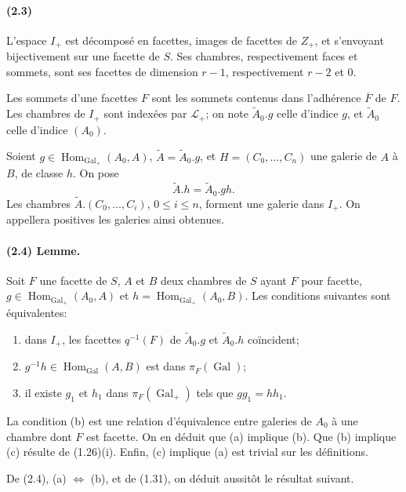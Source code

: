 \documentclass[10pt,a4paper]{article}
\newcommand{\mcL}{\mathcal L}
\begin{document}
\paragraph{(2.3)} L'espace \(I_+\) est décomposé en facettes, images de facettes de \(Z_+\), et s'envoyant bijectivement sur une facette de \(S\). Ses chambres, respectivement faces et sommets, sont ses facettes de dimension \(r-1\), respectivement \(r-2\) et \(0\).

Les sommets d'une facettes \(F\) sont les sommets contenus dans l'adhérence \(\overline F\) de \(F\). Les chambres de \(I_+\) sont indexées par \(\mcL_+\); on note \(\widetilde A_0.g\) celle d'indice \(g\), et \(\widetilde A_0\) celle d'indice \((A_0)\).

Soient \(g\in\operatorname{Hom}_{\operatorname{Gal}_+}(A_0,A)\), \(\widetilde A=\widetilde A_0.g\), et \(H=(C_0,\ldots,C_n)\) une galerie de \(A\) à \(B\), de classe \(h\). On pose
\[
\widetilde A.h=\widetilde A_0.gh.
\]
Les chambres \(\widetilde A.(C_0,\ldots,C_i)\), \(0\le i\le n\), forment une galerie dans \(I_+\). On appellera positives les galeries ainsi obtenues.

\paragraph{(2.4) Lemme.} Soit \(F\) une facette de \(S\), \(A\) et \(B\) deux chambres de \(S\) ayant \(F\) pour facette, \(g\in\operatorname{Hom}_{\operatorname{Gal}_+}(A_0,A)\) et \(h=\operatorname{Hom}_{\operatorname{Gal}_+}(A_0,B)\). Les conditions suivantes sont équivalentes:
\begin{enumerate}[label=(\alph*)]
\item dans \(I_+\), les facettes \(q^{-1}(F)\) de \(\widetilde A_0.g\) et \(\widetilde A_0.h\) coïncident;
\item \(g^{-1}h\in\operatorname{Hom}_{\operatorname{Gal}}(A,B)\) est dans \(\pi_F(\operatorname{Gal})\);
\item il existe \(g_1\) et \(h_1\) dans \(\pi_F(\operatorname{Gal}_+)\) tels que \(gg_1=hh_1\).
\end{enumerate}
La condition (b) est une relation d'équivalence entre galeries de \(A_0\) à une chambre dont \(F\) est facette. On en déduit que (a) implique (b). Que (b) implique (c) résulte de (1.26)(i). Enfin, (c) implique (a) est trivial sur les définitions.

De (2.4), (a) \(\Leftrightarrow\) (b), et de (1.31), on déduit aussitôt le résultat suivant.
\end{document}
